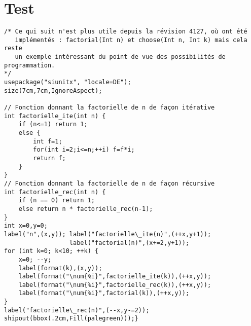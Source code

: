 \documentclass[11pt]{article}
\begin{document}
\section{Test}

\hfill

\begin{lstlisting}[title=Test de coloration]
/* Ce qui suit n'est plus utile depuis la révision 4127, où ont été
   implémentés : factorial(Int n) et choose(Int n, Int k) mais cela reste
   un exemple intéressant du point de vue des possibilités de programmation.
*/
usepackage("siunitx", "locale=DE");
size(7cm,7cm,IgnoreAspect);

// Fonction donnant la factorielle de n de façon itérative
int factorielle_ite(int n) {
    if (n<=1) return 1;
    else {
        int f=1;
        for(int i=2;i<=n;++i) f=f*i;
        return f;
    }
}
// Fonction donnant la factorielle de n de façon récursive
int factorielle_rec(int n) {
    if (n == 0) return 1;
    else return n * factorielle_rec(n-1);
}
int x=0,y=0;
label("n",(x,y)); label("factorielle\_ite(n)",(++x,y+1));
                  label("factorial(n)",(x+=2,y+1));
for (int k=0; k<10; ++k) {
    x=0; --y;
    label(format(k),(x,y));
    label(format("\num{%i}",factorielle_ite(k)),(++x,y));
    label(format("\num{%i}",factorielle_rec(k)),(++x,y));
    label(format("\num{%i}",factorial(k)),(++x,y));   
}
label("factorielle\_rec(n)",(--x,y-=2));
shipout(bbox(.2cm,Fill(palegreen)));}   
\end{lstlisting}
\end{document}

